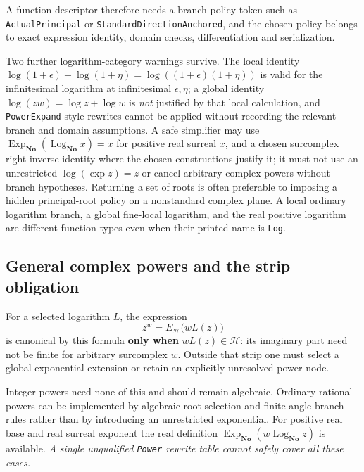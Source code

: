 \documentclass[11pt,letterpaper]{article}
\numberwithin{equation}{section}
\theoremstyle{definition}
\theoremstyle{remark}
\newcommand{\No}{\mathbf{No}}
\newcommand{\HH}{\mathscr H}
\newcommand{\ExpNo}{\operatorname{Exp}_{\No}}
\newcommand{\LogNo}{\operatorname{Log}_{\No}}
\begin{document}
A function descriptor therefore needs a branch policy token such as
\texttt{ActualPrincipal} or \texttt{StandardDirectionAnchored}, and the chosen
policy belongs to exact expression identity, domain checks, differentiation and
serialization.

Two further logarithm-category warnings survive. The local identity
$\log(1+\epsilon)+\log(1+\eta)=\log((1+\epsilon)(1+\eta))$ is valid for the
infinitesimal logarithm at infinitesimal $\epsilon,\eta$; a global identity
$\log(zw)=\log z+\log w$ is \emph{not} justified by that local calculation, and
\texttt{PowerExpand}-style rewrites cannot be applied without recording the
relevant branch and domain assumptions. A safe simplifier may use
$\ExpNo(\LogNo x)=x$ for positive real surreal $x$, and a chosen surcomplex
right-inverse identity where the chosen constructions justify it; it must not
use an unrestricted $\log(\exp z)=z$ or cancel arbitrary complex powers without
branch hypotheses. Returning a set of roots is often preferable to imposing a
hidden principal-root policy on a nonstandard complex plane. A local ordinary
logarithm branch, a global fine-local logarithm, and the real positive logarithm
are different function types even when their printed name is \texttt{Log}.

\subsection{General complex powers and the strip obligation}
\label{cas:sub-powers}
For a selected logarithm $L$, the expression
\[
 z^w=E_{\HH}\bigl(wL(z)\bigr)
\]
is canonical by this formula \textbf{only when} $wL(z)\in\HH$: its imaginary
part need not be finite for arbitrary surcomplex $w$. Outside that strip one
must select a global exponential extension or retain an explicitly unresolved
power node.

Integer powers need none of this and should remain algebraic. Ordinary rational
powers can be implemented by algebraic root selection and finite-angle branch
rules rather than by introducing an unrestricted exponential. For positive real
base and real surreal exponent the real definition $\ExpNo(w\LogNo z)$ is
available. \emph{A single unqualified \texttt{Power} rewrite table cannot safely
cover all these cases.}
\end{document}
